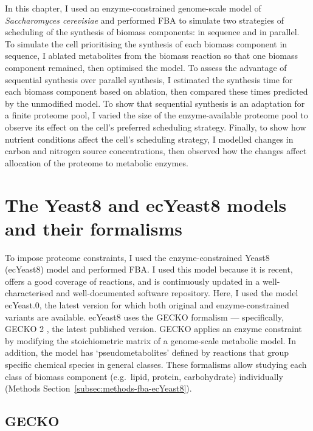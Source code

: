 In this chapter, I used an enzyme-constrained genome-scale model of \textit{Saccharomyces cerevisiae} and performed FBA to simulate two strategies of scheduling of the synthesis of biomass components: in sequence and in parallel.
To simulate the cell prioritising the synthesis of each biomass component in sequence, I ablated metabolites from the biomass reaction so that one biomass component remained, then optimised the model.
To assess the advantage of sequential synthesis over parallel synthesis, I estimated the synthesis time for each biomass component based on ablation, then compared these times predicted by the unmodified model.
To show that sequential synthesis is an adaptation for a finite proteome pool, I varied the size of the enzyme-available proteome pool to observe its effect on the cell's preferred scheduling strategy.
Finally, to show how nutrient conditions affect the cell's scheduling strategy, I modelled changes in carbon and nitrogen source concentrations, then observed how the changes affect allocation of the proteome to metabolic enzymes.


\section{The Yeast8 and ecYeast8 models and their formalisms}
\label{sec:model-yeast8}

To impose proteome constraints, I used the enzyme-constrained Yeast8 (ecYeast8) model \parencite{luConsensusCerevisiaeMetabolic2019} and performed FBA\@.
I used this model because it is recent, offers a good coverage of reactions, and is continuously updated in a well-characterised and well-documented software repository.
Here, I used the model ec\-Yeast.0, the latest version for which both original and enzyme-constrained variants are available.
ecYeast8 uses the GECKO formalism \parencite{sanchezImprovingPhenotypePredictions2017} --- specifically, GECKO 2 \parencite{domenzainReconstructionCatalogueGenomescale2022}, the latest published version.
GECKO applies an enzyme constraint by modifying the stoichiometric matrix of a genome-scale metabolic model.
In addition, the model has `pseudometabolites' defined by reactions that group specific chemical species in general classes.
These formalisms allow studying each class of biomass component (e.g.\ lipid, protein, carbohydrate) individually (Methods Section~\ref{subsec:methods-fba-ecYeast8}).


\subsection{GECKO}
\label{subsec:model-yeast8-gecko}

